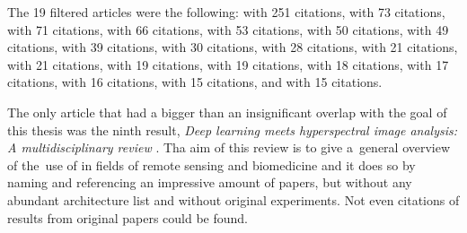 The 19 filtered articles were the following: \cite{dl-for-cv} with 251 citations, \cite{state-of-the-art-dl} with 73 citations, \cite{review-water-dl} with 71 citations, \cite{review-plant-stress} with 66 citations, \cite{review-text-class} with 53 citations, \cite{review-oil-spill} with 50 citations, \cite{review-cv-infra-inspections} with 49 citations, \cite{review-vessel-detection} with 39 citations, \cite{review-ml-smart-grid} with 30 citations, \cite{review-autonomus-vehicles} with 28 citations, \cite{review-grasp} with 21 citations, \cite{review-3d-human-interaction} with 21 citations, \cite{review-dl-3d-classification} with 19 citations, \cite{review-crop-phenomics} with 19 citations, \cite{review-age-estimation} with 18 citations, \cite{review-shot-boundary} with 17 citations, \cite{review-crop-phenomics-breeding} with 16 citations, \cite{review-video-crowd} with 15 citations, and \cite{review-dl-food} with 15 citations.

The only article that had a bigger than an insignificant overlap with the goal of this thesis was the ninth result, \textit{Deep learning meets hyperspectral image analysis: A multidisciplinary review} \cite{review-dl-hs-rs-bio}. Tha aim of this review is to give a~general overview of the~use of  in fields of remote sensing and biomedicine and it does so by naming and referencing an impressive amount of papers, but without any abundant architecture list and without original experiments. Not even citations of results from original papers could be found.
